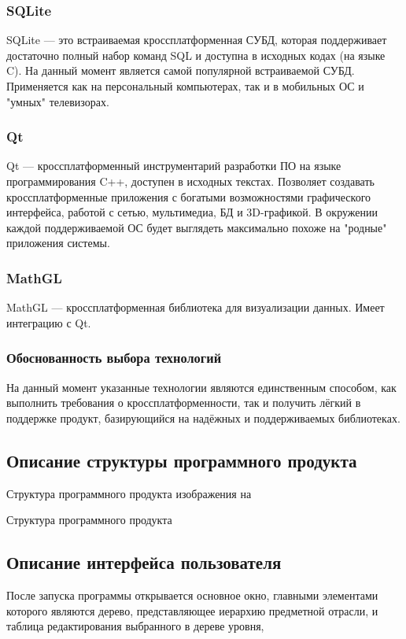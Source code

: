 \subsubsection{SQLite}
SQLite — это встраиваемая кроссплатформенная СУБД, которая поддерживает достаточно полный набор команд SQL и доступна в исходных кодах (на языке C). На данный
момент является самой популярной встраиваемой СУБД. Применяется как на персональный компьютерах, так и в мобильных ОС и "умных" телевизорах.

\subsubsection{Qt}
Qt — кроссплатформенный инструментарий разработки ПО на языке программирования C++, доступен в исходных текстах. Позволяет создавать кроссплатформенные приложения с богатыми возможностями
графического интерфейса, работой с сетью, мультимедиа, БД и 3D-графикой. В окружении каждой поддерживаемой ОС будет выглядеть максимально похоже на "родные" приложения
системы.

\subsubsection{MathGL}
MathGL — кроссплатформенная библиотека для визуализации данных. Имеет интеграцию с Qt.

\subsubsection{Обоснованность выбора технологий}
На данный момент указанные технологии являются единственным способом, как выполнить требования о кроссплатформенности, так и получить лёгкий в поддержке
продукт, базирующийся на надёжных и поддерживаемых библиотеках.

\subsection{Описание структуры программного продукта}
Структура программного продукта изображения на 

 {
  Структура программного продукта
}

\subsection{Описание интерфейса пользователя}
После запуска программы открывается основное окно, главными элементами которого являются дерево, представляющее иерархию предметной отрасли,
и таблица редактирования выбранного в дереве уровня, 

